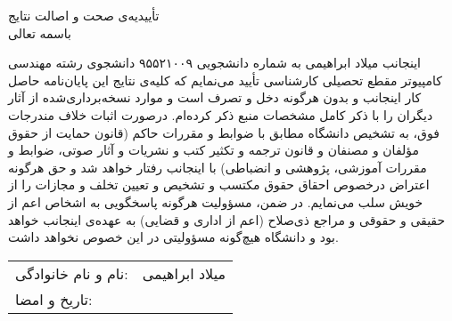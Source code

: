 \newpage
\thispagestyle{empty}

\begin{center}
{\Large
    تأییدیه‌ی صحت و اصالت نتایج \\
}
\vspace{.5cm}
باسمه تعالی
\vspace{.5cm}
\end{center}

اینجانب
میلاد ابراهیمی
به شماره دانشجویی
۹۵۵۲۱۰۰۹
دانشجوی رشته
مهندسی کامپیوتر
مقطع تحصیلی
کارشناسی
تأیید می‌نمایم كه كلیه‌ی نتایج این پایان‌نامه حاصل كار اینجانب و بدون هرگونه دخل و تصرف است و موارد نسخه‌برداری‌شده از آثار دیگران را با ذكر كامل مشخصات منبع ذكر كرده‌ام. درصورت اثبات خلاف مندرجات فوق، به تشخیص دانشگاه مطابق با ضوابط و مقررات حاكم (قانون حمایت از حقوق مؤلفان و مصنفان و قانون ترجمه و تكثیر كتب و نشریات و آثار صوتی، ضوابط و مقررات آموزشی، پژوهشی و انضباطی) با اینجانب رفتار خواهد شد و حق هرگونه اعتراض درخصوص احقاق حقوق مكتسب و تشخیص و تعیین تخلف و مجازات را از خویش سلب می‌نمایم. در ضمن، مسؤولیت هرگونه پاسخگویی به اشخاص اعم از حقیقی و حقوقی و مراجع ذی‌صلاح (اعم از اداری و قضایی) به عهده‌ی اینجانب خواهد بود و دانشگاه هیچ‌گونه مسؤولیتی در این خصوص نخواهد داشت.

\vspace{.5cm}
\begin{flushleft}
\begin{tabular}{lr}
نام و نام خانوادگی:   & 	میلاد ابراهیمی \\
تاریخ و امضا: & \\
\end{tabular}
\end{flushleft}
\cleardoublepage